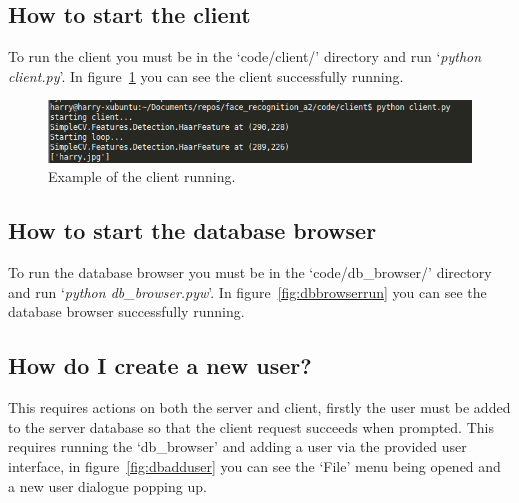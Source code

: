 \documentclass[a4paper]{article}
\begin{document}
    \subsection{How to start the client}
        To run the client you must be in the `code/client/' directory and run `\textit{python client.py}'. In figure~\ref{fig:clientrun} you can 
        see the client successfully running.
        \begin{figure}[H]
            \centering
            \caption{Example of the client running.}
            \label{fig:clientrun}
                \includegraphics[scale=0.6]{../shared_assets/screenshots/manual/clientrun.png}
        \end{figure}


    \subsection{How to start the database browser}
        To run the database browser you must be in the `code/db\_browser/' directory and run `\textit{python db\_browser.pyw}'. In figure~\ref{fig:dbbrowserrun} you can 
        see the database browser successfully running.

    \subsection{How do I create a new user?}
        This requires actions on both the server and client, firstly the user must be added to the server database so that the client request 
        succeeds when prompted. This requires running the `db\_browser' and adding a user via the provided user interface, in figure~\ref{fig:dbadduser}
        you can see the `File' menu being opened and a new user dialogue popping up.
\end{document}
